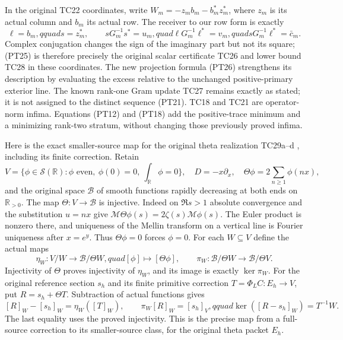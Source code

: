 \documentclass[11pt]{article}
\newcommand{\R}{\mathbb R}
\begin{document}
In the original TC22 coordinates, write
\(W_m=-z_mb_m-b_m^*z_m^*\), where \(z_m\) is its actual
column and \(b_m\) its actual row. The receiver to our row form
is exactly
\begin{equation}\tag{PT32}
 \ell=b_m,qquad s=z_m^*,\qquad
 sG_m^{-1}s^*=u_m,quad \ell G_m^{-1}\ell^*=v_m,quad
 sG_m^{-1}\ell^*=\bar c_m.
\end{equation}
Complex conjugation changes the sign of the imaginary part but
not its square; (PT25) is therefore precisely the original scalar
certificate TC26 and lower bound TC28 in these coordinates. The
new projection formula (PT26) strengthens its description by
evaluating the excess relative to the unchanged positive-primary
exterior line. The known rank-one Gram update TC27 remains exactly
as stated; it is not assigned to the distinct sequence (PT21).
TC18 and TC21 are operator-norm infima. Equations (PT12) and
(PT18) add the positive-trace minimum and a minimizing rank-two
stratum, without changing those previously proved infima.

Here is the exact smaller-source map for the original theta
realization TC29a--d \cite{tc}, including its finite correction.
Retain
\[
 V=\{\phi\in\mathcal S(\R):\phi\text{ even},\ \phi(0)=0,
                 \ \int_\R\phi=0\},\quad D=-x\partial_x,
 \quad\Theta\phi=2\sum_{n\ge1}\phi(nx),
\]
and the original space \(\mathscr B\) of smooth functions rapidly
decreasing at both ends on \(\R_{>0}\). The map \(\Theta:V\to
\mathscr B\) is injective. Indeed on \(\Re s>1\) absolute
convergence and the substitution \(u=nx\) give
\(\mathcal M\Theta\phi(s)=2\zeta(s)\mathcal M\phi(s)\).
The Euler product is nonzero there, and uniqueness of the Mellin
transform on a vertical line is Fourier uniqueness after \(x=e^y\).
Thus \(\Theta\phi=0\) forces \(\phi=0\).
For each \(W\subseteq V\) define the actual maps
\[
 \eta_W:V/W\longrightarrow\mathscr B/\Theta W,quad
 [\phi]\longmapsto[\Theta\phi],\qquad
 \pi_W:\mathscr B/\Theta W\longrightarrow\mathscr B/\Theta V.
\]
Injectivity of \(\Theta\) proves injectivity of \(\eta_W\),
and its image is exactly \(\ker\pi_W\). For the original
reference section \(s_h\) and its finite primitive correction
\(T=\Phi_LC:E_h\to V\), put \(R=s_h+\Theta T\). Subtraction
of actual functions gives
\begin{equation}\tag{PT33}
 [R]_W-[s_h]_W=\eta_W([T]_W),\qquad
 \pi_W[R]_W=[s_h]_V,qquad
 \ker([R-s_h]_W)=T^{-1}W.
\end{equation}
The last equality uses the proved injectivity. This is the
precise map from a full-source correction to its smaller-source
class, for the original theta packet \(E_h\).
\end{document}
